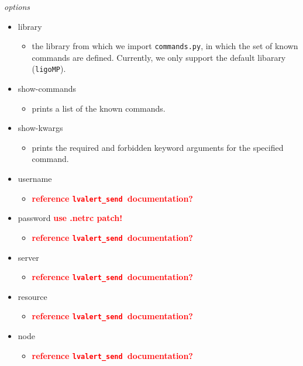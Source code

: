 \documentclass{article}
\newcommand{\FIXME}[1]{\textcolor{red}{\textbf{#1}}}
\newcommand{\lvalertSend}{\texttt{lvalert\_send}}
\begin{document}
\noindent
\textit{options}

\begin{itemize}
    \item{library
        \begin{itemize}
            \item{the library from which we import \texttt{commands.py}, in which the set of known commands are defined. Currently, we only support the default libarary (\texttt{ligoMP}).}
        \end{itemize}
         }
    \item{show-commands
        \begin{itemize}
            \item{prints a list of the known commands.}
        \end{itemize}
         }
    \item{show-kwargs
        \begin{itemize}
            \item{prints the required and forbidden keyword arguments for the specified command.}
        \end{itemize}
         }
    \item{username
        \begin{itemize}
            \item{\FIXME{reference \lvalertSend~documentation?}}
        \end{itemize}
         }
    \item{password \FIXME{use .netrc patch!}
        \begin{itemize}
            \item{\FIXME{reference \lvalertSend~documentation?}}
        \end{itemize}
         }
    \item{server
        \begin{itemize}
            \item{\FIXME{reference \lvalertSend~documentation?}}
        \end{itemize}
         }
    \item{resource
        \begin{itemize}
            \item{\FIXME{reference \lvalertSend~documentation?}}
        \end{itemize}
         }
    \item{node
        \begin{itemize}
            \item{\FIXME{reference \lvalertSend~documentation?}}

\end{itemize}}
\end{itemize}
\end{document}
